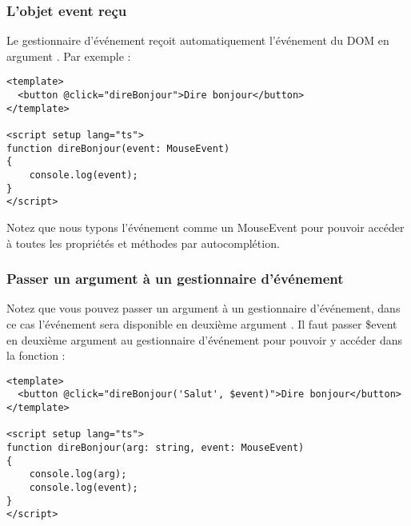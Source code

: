 \subsubsection{L'objet {\color{monOrange}event} reçu}
Le gestionnaire d'événement reçoit automatiquement l'événement du DOM en argument . Par exemple :
\begin{verbatim}
<template>
  <button @click="direBonjour">Dire bonjour</button>
</template>

<script setup lang="ts">
function direBonjour(event: MouseEvent)
{
    console.log(event);
}
</script>
\end{verbatim}
Notez que nous typons l'événement comme un {\color{monOrange}MouseEvent} pour pouvoir accéder à toutes les propriétés et méthodes par autocomplétion.

\subsubsection{Passer un argument à un gestionnaire d'événement}
Notez que vous pouvez passer un argument à un gestionnaire d'événement, dans ce cas l'événement sera disponible en deuxième argument . Il faut passer {\color{monOrange}\$event} en deuxième argument au gestionnaire d'événement pour pouvoir y accéder dans la fonction :
\begin{verbatim}
<template>
  <button @click="direBonjour('Salut', $event)">Dire bonjour</button>
</template>

<script setup lang="ts">
function direBonjour(arg: string, event: MouseEvent)
{
    console.log(arg);
    console.log(event);
}
</script>
\end{verbatim}

